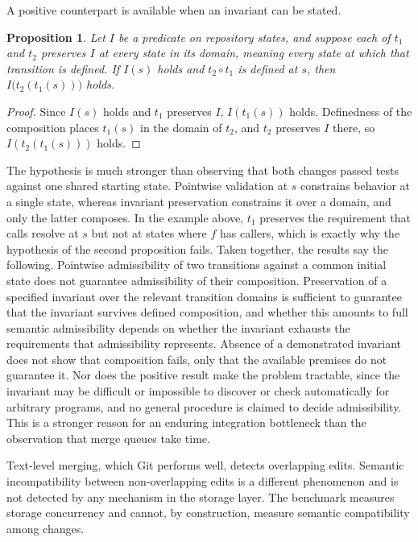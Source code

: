 \documentclass[11pt]{article}
\theoremstyle{definition}
\theoremstyle{plain}
\newtheorem{proposition}{Proposition}
\begin{document}
A positive counterpart is available when an invariant can be stated.

\begin{proposition}
Let $I$ be a predicate on repository states, and suppose each of $t_1$ and $t_2$ preserves $I$ at every state in its domain, meaning every state at which that transition is defined. If $I(s)$ holds and $t_2\circ t_1$ is defined at $s$, then $I\big(t_2(t_1(s))\big)$ holds.
\end{proposition}
\begin{proof}
Since $I(s)$ holds and $t_1$ preserves $I$, $I(t_1(s))$ holds. Definedness of the composition places $t_1(s)$ in the domain of $t_2$, and $t_2$ preserves $I$ there, so $I(t_2(t_1(s)))$ holds.
\end{proof}

The hypothesis is much stronger than observing that both changes passed tests against one shared starting state. Pointwise validation at $s$ constrains behavior at a single state, whereas invariant preservation constrains it over a domain, and only the latter composes. In the example above, $t_1$ preserves the requirement that calls resolve at $s$ but not at states where $f$ has callers, which is exactly why the hypothesis of the second proposition fails. Taken together, the results say the following. Pointwise admissibility of two transitions against a common initial state does not guarantee admissibility of their composition. Preservation of a specified invariant over the relevant transition domains is sufficient to guarantee that the invariant survives defined composition, and whether this amounts to full semantic admissibility depends on whether the invariant exhausts the requirements that admissibility represents. Absence of a demonstrated invariant does not show that composition fails, only that the available premises do not guarantee it. Nor does the positive result make the problem tractable, since the invariant may be difficult or impossible to discover or check automatically for arbitrary programs, and no general procedure is claimed to decide admissibility. This is a stronger reason for an enduring integration bottleneck than the observation that merge queues take time.

Text-level merging, which Git performs well, detects overlapping edits. Semantic incompatibility between non-overlapping edits is a different phenomenon and is not detected by any mechanism in the storage layer. The benchmark measures storage concurrency and cannot, by construction, measure semantic compatibility among changes.
\end{document}
